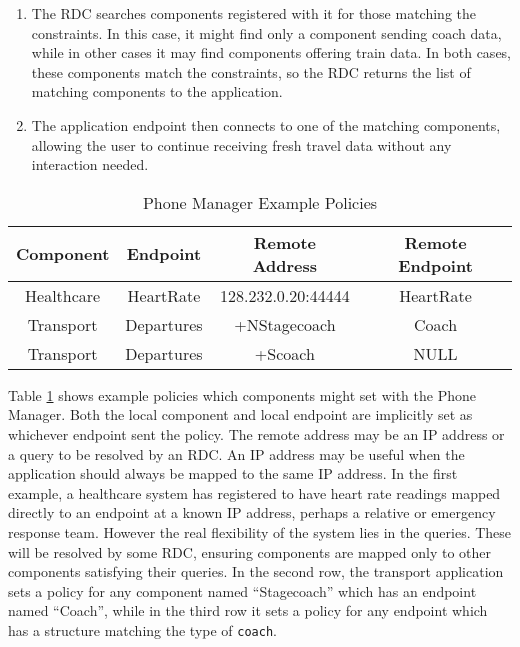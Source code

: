 \documentclass[12pt,twoside,notitlepage]{report}
\begin{document}
\begin{enumerate}
\item The RDC searches components registered with it for those matching the constraints. In this case, it might find only a component sending coach data, while in other cases it may find components offering train data. In both cases, these components match the constraints, so the RDC returns the list of matching components to the application.

\item The application endpoint then connects to one of the matching components, allowing the user to continue receiving fresh travel data without any interaction needed.

\end{enumerate}

\begin{table}[tbh]
\centering

\begin{tabular}{c c c c}
\hline\hline
Component & Endpoint & Remote Address & Remote Endpoint \\
\hline

Healthcare & HeartRate & 128.232.0.20:44444 & HeartRate \\
Transport & Departures & +NStagecoach & Coach \\
Transport & Departures & +Scoach & NULL \\

\hline
\end{tabular}

\caption{Phone Manager Example Policies}
\label{tab:example_policies}
\end{table}

Table \ref{tab:example_policies} shows example policies which components might set with the Phone Manager. 
Both the local component and local endpoint are implicitly set as whichever endpoint sent the policy. 
The remote address may be an IP address or a query to be resolved by an RDC. 
An IP address may be useful when the application should always be mapped to the same IP address. 
In the first example, a healthcare system has registered to have heart rate readings mapped directly to an endpoint at a known IP address, perhaps a relative or emergency response team. 
However the real flexibility of the system lies in the queries. 
These will be resolved by some RDC, ensuring components are mapped only to other components satisfying their queries. 
In the second row, the transport application sets a policy for any component named ``Stagecoach'' which has an endpoint named ``Coach'', while in the third row it sets a policy for any endpoint which has a structure matching the type of {\tt coach}. 
\end{document}
